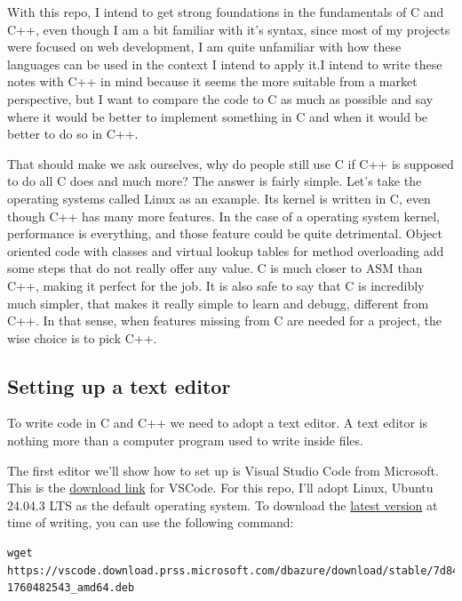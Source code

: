 \documentclass{article}
\begin{document}
With this repo, I intend to get strong foundations in the fundamentals of C and C++, even though I am a bit familiar with it's syntax, since most of my projects were focused on web development, I am quite unfamiliar with how these languages can be used in the context I intend to apply it.I intend to write these notes with C++ in mind because it seems the more suitable from a market perspective, but I want to compare the code to C as much as possible and say where it would be better to implement something in C and when it would be better to do so in C++.

That should make we ask ourselves, why do people still use C if C++ is supposed to do all C does and much more? The answer is fairly simple. Let's take the operating systems called Linux as an example. Its kernel is written in C, even though C++ has many more features. In the case of a operating system kernel, performance is everything, and those feature could be quite detrimental. Object oriented code with classes and virtual lookup tables for method overloading add some steps that do not really offer any value. C is much closer to ASM than C++, making it perfect for the job. It is also safe to say that C is incredibly much simpler, that makes it really simple to learn and debugg, different from C++. \cite{CaptainAwesomePants2021} In that sense, when features missing from C are needed for a project, the wise choice is to pick C++.


\subsection{Setting up a text editor}
To write code in C and C++ we need to adopt a text editor. A text editor is nothing more than a computer program used to write inside files.

The first editor we'll show how to set up is Visual Studio Code from Microsoft. This is the \href{https://code.visualstudio.com/download}{download link} for VSCode. For this repo, I'll adopt Linux, Ubuntu 24.04.3 LTS as the default operating system. To download the \href{https://go.microsoft.com/fwlink/?LinkID=760868}{latest version} at time of writing, you can use the following command:

\begin{verbatim}
wget https://vscode.download.prss.microsoft.com/dbazure/download/stable/7d842fb85a0275a4a8e4d7e040d2625abbf7f084/code_1.105.1-1760482543_amd64.deb
\end{verbatim}
\end{document}
